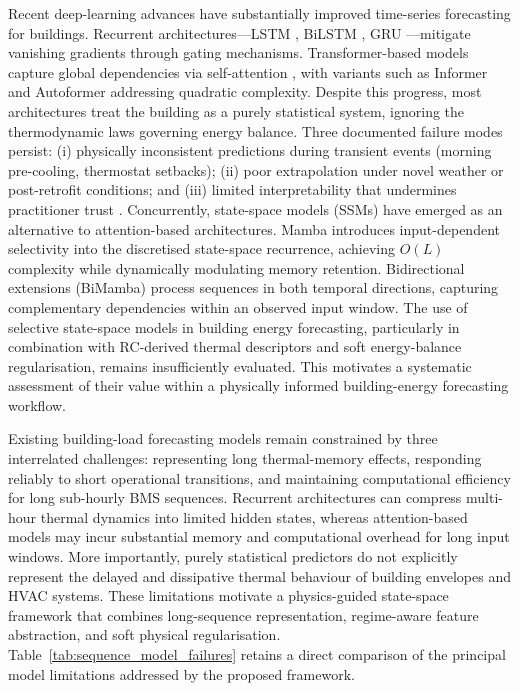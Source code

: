 \documentclass[11pt]{article}
\begin{document}
Recent deep-learning advances have substantially improved time-series forecasting for buildings. Recurrent architectures---LSTM \cite{15}, BiLSTM \cite{16}, GRU \cite{17}---mitigate vanishing gradients through gating mechanisms. Transformer-based models capture global dependencies via self-attention \cite{18}, with variants such as Informer \cite{19} and Autoformer \cite{20} addressing quadratic complexity. Despite this progress, most architectures treat the building as a purely statistical system, ignoring the thermodynamic laws governing energy balance. Three documented failure modes persist: (i) physically inconsistent predictions during transient events (morning pre-cooling, thermostat setbacks); (ii) poor extrapolation under novel weather or post-retrofit conditions; and (iii) limited interpretability that undermines practitioner trust \cite{21}. Concurrently, state-space models (SSMs) have emerged as an alternative to attention-based architectures. Mamba \cite{22} introduces input-dependent selectivity into the discretised state-space recurrence, achieving $O(L)$ complexity while dynamically modulating memory retention. Bidirectional extensions (BiMamba) \cite{23} process sequences in both temporal directions, capturing complementary dependencies within an observed input window. The use of selective state-space models in building energy forecasting, particularly in combination with RC-derived thermal descriptors and soft energy-balance regularisation, remains insufficiently evaluated. This motivates a systematic assessment of their value within a physically informed building-energy forecasting workflow.

Existing building-load forecasting models remain constrained by three interrelated challenges: representing long thermal-memory effects, responding reliably to short operational transitions, and maintaining computational efficiency for long sub-hourly BMS sequences. Recurrent architectures can compress multi-hour thermal dynamics into limited hidden states, whereas attention-based models may incur substantial memory and computational overhead for long input windows. More importantly, purely statistical predictors do not explicitly represent the delayed and dissipative thermal behaviour of building envelopes and HVAC systems. These limitations motivate a physics-guided state-space framework that combines long-sequence representation, regime-aware feature abstraction, and soft physical regularisation. Table~\ref{tab:sequence_model_failures} retains a direct comparison of the principal model limitations addressed by the proposed framework.
\end{document}
